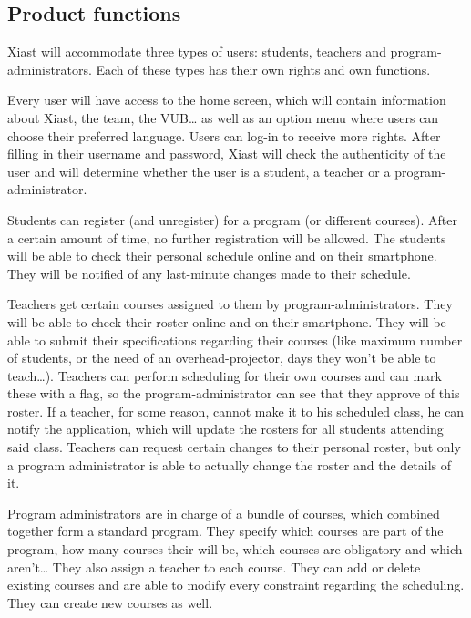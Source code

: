 \documentclass[12pt]{article}
\begin{document}
\subsection{Product functions}\label{product-functions}

Xiast will accommodate three types of users: students, teachers and
program-administrators. Each of these types has their own rights and own
functions.

Every user will have access to the home screen, which will contain
information about Xiast, the team, the VUB\ldots{} as well as an option
menu where users can choose their preferred language. Users can log-in
to receive more rights. After filling in their username and password,
Xiast will check the authenticity of the user and will determine whether
the user is a student, a teacher or a program-administrator.

Students can register (and unregister) for a program (or different
courses). After a certain amount of time, no further registration will
be allowed. The students will be able to check their personal schedule
online and on their smartphone. They will be notified of any last-minute
changes made to their schedule.

Teachers get certain courses assigned to them by program-administrators.
They will be able to check their roster online and on their smartphone.
They will be able to submit their specifications regarding their courses
(like maximum number of students, or the need of an overhead-projector,
days they won't be able to teach\ldots{}). Teachers can perform
scheduling for their own courses and can mark these with a flag, so the
program-administrator can see that they approve of this roster. If a
teacher, for some reason, cannot make it to his scheduled class, he can
notify the application, which will update the rosters for all students
attending said class. Teachers can request certain changes to their
personal roster, but only a program administrator is able to actually
change the roster and the details of it.

Program administrators are in charge of a bundle of courses, which
combined together form a standard program. They specify which courses
are part of the program, how many courses their will be, which courses
are obligatory and which aren't\ldots{} They also assign a teacher to
each course. They can add or delete existing courses and are able to
modify every constraint regarding the scheduling. They can create new
courses as well.
\end{document}
